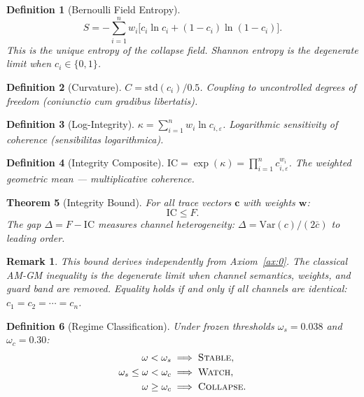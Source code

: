 \documentclass[
  aps,
  prd,
  preprint,
  superscriptaddress,
  nofootinbib,
  floatfix,
  longbibliography
]{revtex4-2}
\newtheorem{theorem}{Theorem}
\newtheorem{definition}[theorem]{Definition}
\newtheorem{remark}{Remark}
\newcommand{\eps}{\varepsilon}
\newcommand{\beq}{\begin{equation}}
\newcommand{\eeq}{\end{equation}}
\newcommand{\regime}[1]{\textnormal{\textsc{#1}}}
\newcommand{\tvec}{\mathbf{c}}
\newcommand{\wvec}{\mathbf{w}}
\newcommand{\IC}{\mathrm{IC}}
\newcommand{\Fid}{F}
\newcommand{\Drft}{\omega}
\newcommand{\Ent}{S}
\newcommand{\Curv}{C}
\newcommand{\Logint}{\kappa}
\newcommand{\hetgap}{\Delta}
\newcommand{\lat}[1]{\textit{#1}}
\begin{document}
\begin{definition}[Bernoulli Field Entropy]\label{def:S}
\beq
  \Ent = -\sum_{i=1}^{n} w_i
    \bigl[c_i \ln c_i + (1 - c_i)\ln(1-c_i)\bigr].
\eeq
This is the unique entropy of the collapse field.
Shannon entropy is the degenerate limit when $c_i \in \{0,1\}$.
\end{definition}

\begin{definition}[Curvature]\label{def:C}
$\Curv = \mathrm{std}(c_i) / 0.5$. \quad
Coupling to uncontrolled degrees of freedom
(\lat{coniunctio cum gradibus libertatis}).
\end{definition}

\begin{definition}[Log-Integrity]\label{def:kappa}
$\Logint = \sum_{i=1}^{n} w_i \ln c_{i,\eps}$. \quad
Logarithmic sensitivity of coherence
(\lat{sensibilitas logarithmica}).
\end{definition}

\begin{definition}[Integrity Composite]\label{def:IC}
$\IC = \exp(\Logint) = \prod_{i=1}^{n} c_{i,\eps}^{w_i}$. \quad
The weighted geometric mean — multiplicative coherence.
\end{definition}

\begin{theorem}[Integrity Bound]\label{thm:ICbound}
For all trace vectors $\tvec$ with weights $\wvec$:
\beq
  \IC \leq \Fid.
\eeq
The gap $\hetgap = \Fid - \IC$ measures channel
heterogeneity: $\hetgap = \mathrm{Var}(c) / (2\bar{c})$
to leading order.
\end{theorem}

\begin{remark}
This bound derives independently from Axiom~\ref{ax:0}.
The classical AM-GM inequality is the degenerate limit
when channel semantics, weights, and guard band are removed.
Equality holds if and only if all channels are identical:
$c_1 = c_2 = \cdots = c_n$.
\end{remark}

\begin{definition}[Regime Classification]\label{def:regime}
Under frozen thresholds
$\Drft_s = 0.038$ and $\Drft_c = 0.30$:
\begin{align}
  \Drft < \Drft_s &\implies \regime{Stable}, \nonumber\\
  \Drft_s \leq \Drft < \Drft_c &\implies \regime{Watch}, \nonumber\\
  \Drft \geq \Drft_c &\implies \regime{Collapse}.
\end{align}
\end{definition}
\end{document}
